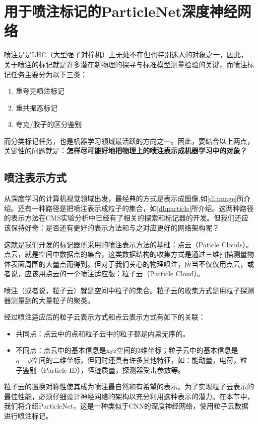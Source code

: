 \chapter{用于喷注标记的ParticleNet深度神经网络}
\label{chap4}
\fontsize{12bp}{14.4pt}

喷注是是LHC（大型强子对撞机）上无处不在但也特别迷人的对象之一，因此，关于喷注的标记就是许多潜在新物理的探寻与标准模型测量检验的关键，而喷注标记任务主要分为以下三类：
\begin{enumerate}[1.]
    \item 重夸克喷注标记
    \item 重共振态标记
    \item 夸克/胶子的区分鉴别
\end{enumerate}
\cdots

而分类标记任务，也是机器学习领域最活跃的方向之一。因此，要结合以上两点，关键性的问题就是：\textbf{怎样尽可能好地把物理上的喷注表示成机器学习中的对象？}
\section{喷注表示方式}
从深度学习的计算机视觉领域出发，最经典的方式是表示成图像,如\ref{dl:image}所介绍。还有一种路径是把喷注表示成粒子的集合，如\ref{dl:particle}所介绍。这两种路径的表示方法在CMS实验分析中已经有了相关的探索和标记器的开发。但我们还应该保持好奇：是否还有更好的表示方法和与之对应更好的网络架构呢？

这就是我们开发的标记器所采用的喷注表示方法的基础：点云（Paticle Clouds）。点云，就是空间中数据点的集合，这类数据结构的收集方式是通过三维扫描测量物体表面周围的大量点而得到。但对于我们关心的物理喷注，应当不仅仅用点云，或者说，应该用点云的一个喷注适应版：粒子云（Particle Cloud）。

喷注（或者说，粒子云）就是空间中粒子的集合。粒子云的收集方式是用粒子探测器测量到的大量粒子的聚类。

经过喷注适应后的粒子云表示方式和点云表示方式有如下的关联：
\begin{itemize}
    \item 共同点：点云中的点和粒子云中的粒子都是内禀无序的。
    \item 不同点：点云中的基本信息是xyz空间的3维坐标；粒子云中的基本信息是$\eta-\phi$空间的二维坐标，但同时还具有许多其他特征，如：能动量，电荷，粒子鉴别（Particle ID），径迹质量，探测器受击参数等。
\end{itemize}
粒子云的置换对称性使其成为喷注最自然和有希望的表示。为了实现粒子云表示的最佳性能，必须仔细设计神经网络的架构以充分利用这种表示的潜力。在本节中，我们将介绍ParticleNet，这是一种类似于CNN的深度神经网络，使用粒子云数据进行喷注标记。
